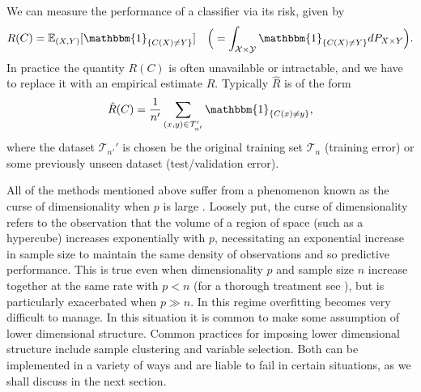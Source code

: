 \documentclass[12pt]{article}
\begin{document}
We can measure the performance of a classifier via its risk, given by 
\[R(C) = \mathbb{E}_{(X,Y)}[\mathbbm{1}_{\{C(X) \neq Y\}}] \quad \Big( = \int_{\mathcal{X}\times \mathcal{Y}} \mathbbm{1}_{\{C(X) \neq Y\}} dP_{X\times Y}\Big).\]
In practice the quantity $R(C)$ is often unavailable or intractable, and we have to replace it with an empirical estimate $\hat{R}$. Typically $\hat{R}$ is of the form
\[\hat{R}(C) = \frac{1}{n'} \sum_{(x,y) \in \mathcal{T}_{n'}'} \mathbbm{1}_{\{C(x) \neq y\}},\] 
where the dataset $\mathcal{T}_{n'}'$ is chosen be the original training set $\mathcal{T}_n$ (training error) or some previously unseen dataset (test/validation error).

All of the methods mentioned above suffer from a phenomenon known as the curse of dimensionality when $p$ is large \citep{mai_review_2013}. Loosely put, the curse of dimensionality refers to the observation that the volume of a region of space (such as a hypercube) increases exponentially with $p$, necessitating an exponential increase in sample size to maintain the same density of observations and so predictive performance. This is true even when dimensionality $p$ and sample size $n$ increase together at the same rate with $p<n$ (for a thorough treatment see \citet{wainwright_high-dimensional_2019}), but is particularly exacerbated when $p \gg n$. In this regime overfitting becomes very difficult to manage. In this situation it is common to make some assumption of lower dimensional structure. Common practices for imposing lower dimensional structure include sample clustering and variable selection. Both can be implemented in a variety of ways and are liable to fail in certain situations, as we shall discuss in the next section.
\end{document}
